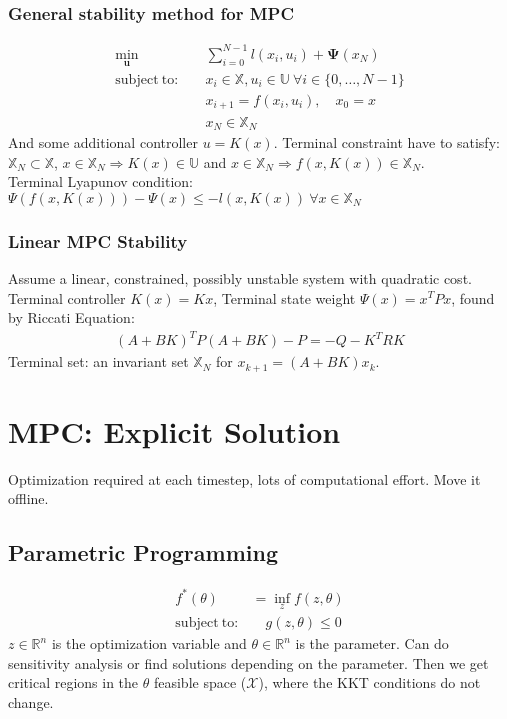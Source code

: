 \documentclass[a4paper,landscape,8pt,fleqn]{scrartcl}
\newcommand{\mb}[1]{\mathbb{#1}}
\newcommand{\mf}[1]{\mathbf{#1}}
\newcommand{\mc}[1]{\mathcal{#1}}
\begin{document}
\begin{multicols}{3}
\subsubsection{General stability method for MPC}
\begin{align*}
	\min_{\mf{u}}&\quad \sum_{i=0}^{N-1} l(x_i,u_i) + \mf{\Psi}(x_N) \\
	\mathrm{subject~to:}&\quad x_i \in \mb{X}, u_i \in \mb{U} ~\forall i \in \{0,\dots,N-1\}\\
	&\quad x_{i+1} = f(x_i,u_i), \quad x_0 = x \\
	&\quad x_N \in \mb{X}_N
\end{align*}
And some additional controller $u = K(x)$. Terminal constraint have to satisfy: $\mb{X}_N \subset \mb{X}$, $x \in \mb{X}_N \Rightarrow K(x)\in \mb{U}$ and $x \in \mb{X}_N \Rightarrow f(x,K(x)) \in \mb{X}_N$.\\
Terminal Lyapunov condition: \\$ \Psi(f(x,K(x))) - \Psi(x) \leq - l(x,K(x)) ~\forall x \in \mb{X}_N$
\subsubsection{Linear MPC Stability}
Assume a linear, constrained, possibly unstable system with quadratic cost. Terminal controller $K(x) = Kx$, Terminal state weight $ \Psi(x) = x^T P x$, found by Riccati Equation:
\begin{align*}
	(A+BK)^T P (A+BK) - P = - Q - K^T R K
\end{align*}
Terminal set: an invariant set $\mb{X}_N$ for $x_{k+1} = (A+BK)x_k$.
\section{MPC: Explicit Solution}
Optimization required at each timestep, lots of computational effort. Move it offline.
\subsection{Parametric Programming}
\begin{align*}
	f^*(\theta) &= \inf_z f(z,\theta) \\
	\mathrm{subject~to:}&\quad g(z,\theta) \leq 0
\end{align*}
$z \in \mb{R}^n$ is the optimization variable and $\theta \in \mb{R}^n$ is the parameter. Can do sensitivity analysis or find solutions depending on the parameter. Then we get critical regions in the $\theta$ feasible space ($\mc{X}$), where the KKT conditions do not change.

\end{multicols}
\end{document}
